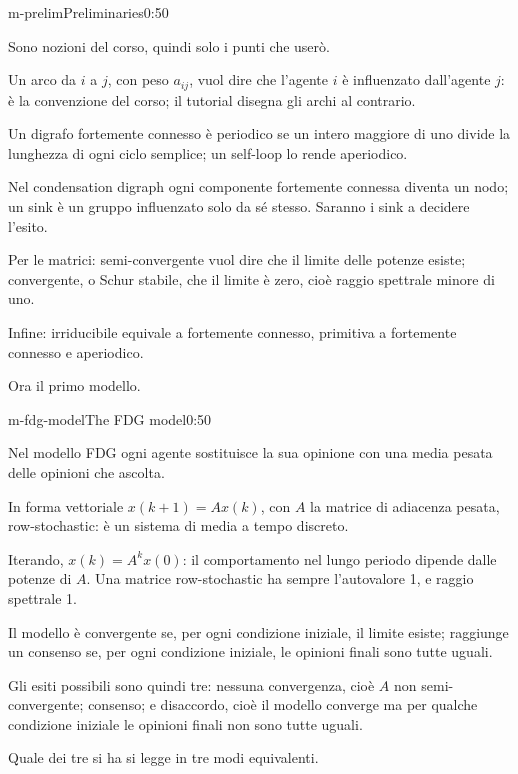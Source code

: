 \begin{slide}{m-prelim}{Preliminaries}{0:50}
  \begin{discorso}
    \item Sono nozioni del corso, quindi solo i punti che userò.
    \item Un arco da $i$ a $j$, con peso $a_{ij}$, vuol dire che l'agente $i$ è influenzato dall'agente $j$: è la convenzione del corso; il tutorial disegna gli archi al contrario.
    \item Un digrafo fortemente connesso è periodico se un intero maggiore di uno divide la lunghezza di ogni ciclo semplice; un self-loop lo rende aperiodico.
    \item Nel condensation digraph ogni componente fortemente connessa diventa un nodo; un sink è un gruppo influenzato solo da sé stesso. Saranno i sink a decidere l'esito.
    \item Per le matrici: semi-convergente vuol dire che il limite delle potenze esiste; convergente, o Schur stabile, che il limite è zero, cioè raggio spettrale minore di uno.
    \item Infine: irriducibile equivale a fortemente connesso, primitiva a fortemente connesso e aperiodico.
    \item Ora il primo modello.
  \end{discorso}
\end{slide}


\begin{slide}{m-fdg-model}{The FDG model}{0:50}
  \begin{discorso}
    \item Nel modello FDG ogni agente sostituisce la sua opinione con una media pesata delle opinioni che ascolta.
    \item In forma vettoriale $x(k+1)=Ax(k)$, con $A$ la matrice di adiacenza pesata, row-stochastic: è un sistema di media a tempo discreto.
    \item Iterando, $x(k)=A^kx(0)$: il comportamento nel lungo periodo dipende dalle potenze di $A$. Una matrice row-stochastic ha sempre l'autovalore 1, e raggio spettrale 1.
    \item Il modello è convergente se, per ogni condizione iniziale, il limite esiste; raggiunge un consenso se, per ogni condizione iniziale, le opinioni finali sono tutte uguali.
    \item Gli esiti possibili sono quindi tre: nessuna convergenza, cioè $A$ non semi-convergente; consenso; e disaccordo, cioè il modello converge ma per qualche condizione iniziale le opinioni finali non sono tutte uguali.
    \item Quale dei tre si ha si legge in tre modi equivalenti.
  \end{discorso}
\end{slide}

